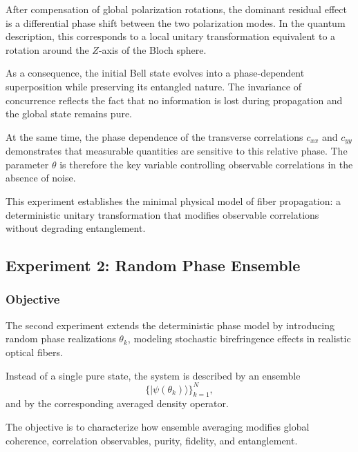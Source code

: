 \documentclass[a4paper]{article}
\begin{document}
After compensation of global polarization rotations, the dominant residual effect is a differential phase shift between the two polarization modes. In the quantum description, this corresponds to a local unitary transformation equivalent to a rotation around the \(Z\)-axis of the Bloch sphere.

As a consequence, the initial Bell state evolves into a phase-dependent superposition while preserving its entangled nature. The invariance of concurrence reflects the fact that no information is lost during propagation and the global state remains pure.

At the same time, the phase dependence of the transverse correlations \(c_{xx}\) and \(c_{yy}\) demonstrates that measurable quantities are sensitive to this relative phase. The parameter \( \theta \) is therefore the key variable controlling observable correlations in the absence of noise.

This experiment establishes the minimal physical model of fiber propagation: a deterministic unitary transformation that modifies observable correlations without degrading entanglement.


\subsection{Experiment 2: Random Phase Ensemble}


\subsubsection{Objective}

The second experiment extends the deterministic phase model by introducing random phase realizations \( \theta_k \), modeling stochastic birefringence effects in realistic optical fibers.

Instead of a single pure state, the system is described by an ensemble
\[
\{ |\psi(\theta_k)\rangle \}_{k=1}^{N},
\]
and by the corresponding averaged density operator.

The objective is to characterize how ensemble averaging modifies global coherence, correlation observables, purity, fidelity, and entanglement.
\end{document}
